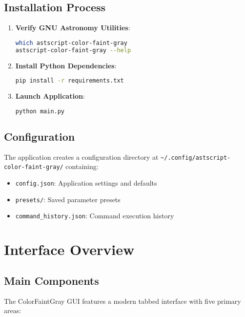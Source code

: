 \documentclass[11pt,a4paper]{article}
\begin{document}
\subsection{Installation Process}

\begin{enumerate}
\item \textbf{Verify GNU Astronomy Utilities}:
\begin{lstlisting}[language=bash]
which astscript-color-faint-gray
astscript-color-faint-gray --help
\end{lstlisting}

\item \textbf{Install Python Dependencies}:
\begin{lstlisting}[language=bash]
pip install -r requirements.txt
\end{lstlisting}

\item \textbf{Launch Application}:
\begin{lstlisting}[language=bash]
python main.py
\end{lstlisting}
\end{enumerate}

\subsection{Configuration}

The application creates a configuration directory at
\texttt{\~{}/.config/astscript-color-faint-gray/} containing:

\begin{itemize}[leftmargin=*]
\item \texttt{config.json}: Application settings and defaults
\item \texttt{presets/}: Saved parameter presets
\item \texttt{command\_history.json}: Command execution history
\end{itemize}

\section{Interface Overview}

\subsection{Main Components}

The ColorFaintGray GUI features a modern tabbed interface with five primary
areas:
\end{document}
